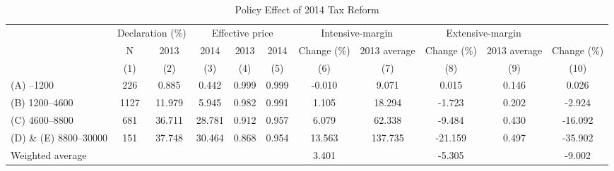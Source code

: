 \begin{table}

\caption{\label{tab:policy-effect}Policy Effect of 2014 Tax Reform}
\centering
\fontsize{7}{9}\selectfont
\begin{threeparttable}
\begin{tabular}[t]{>{\raggedright\arraybackslash}p{10em}cccccccccc}
\toprule
\multicolumn{2}{c}{ } & \multicolumn{2}{c}{Declaration (\%)} & \multicolumn{3}{c}{Effective price} & \multicolumn{2}{c}{Intensive-margin} & \multicolumn{2}{c}{Extensive-margin} \\
\cmidrule(l{3pt}r{3pt}){3-4} \cmidrule(l{3pt}r{3pt}){5-7} \cmidrule(l{3pt}r{3pt}){8-9} \cmidrule(l{3pt}r{3pt}){10-11}
\multicolumn{1}{c}{2013 Income bracket} & \multicolumn{1}{c}{N} & \multicolumn{1}{c}{2013} & \multicolumn{1}{c}{2014} & \multicolumn{1}{c}{2013} & \multicolumn{1}{c}{2014} & \multicolumn{1}{c}{Change (\%)} & \multicolumn{1}{c}{2013 average} & \multicolumn{1}{c}{Change (\%)} & \multicolumn{1}{c}{2013 average} & \multicolumn{1}{c}{Change (\%)} \\
\cmidrule(l{3pt}r{3pt}){1-1} \cmidrule(l{3pt}r{3pt}){2-2} \cmidrule(l{3pt}r{3pt}){3-3} \cmidrule(l{3pt}r{3pt}){4-4} \cmidrule(l{3pt}r{3pt}){5-5} \cmidrule(l{3pt}r{3pt}){6-6} \cmidrule(l{3pt}r{3pt}){7-7} \cmidrule(l{3pt}r{3pt}){8-8} \cmidrule(l{3pt}r{3pt}){9-9} \cmidrule(l{3pt}r{3pt}){10-10} \cmidrule(l{3pt}r{3pt}){11-11}
 & (1) & (2) & (3) & (4) & (5) & (6) & (7) & (8) & (9) & (10)\\
\midrule
(A) --1200 & 226 & 0.885 & 0.442 & 0.999 & 0.999 & -0.010 & 9.071 & 0.015 & 0.146 & 0.026\\
(B) 1200--4600 & 1127 & 11.979 & 5.945 & 0.982 & 0.991 & 1.105 & 18.294 & -1.723 & 0.202 & -2.924\\
(C) 4600--8800 & 681 & 36.711 & 28.781 & 0.912 & 0.957 & 6.079 & 62.338 & -9.484 & 0.430 & -16.092\\
(D) \& (E) 8800--30000 & 151 & 37.748 & 30.464 & 0.868 & 0.954 & 13.563 & 137.735 & -21.159 & 0.497 & -35.902\\
Weighted average &  &  &  &  &  & 3.401 &  & -5.305 &  & -9.002\\
\bottomrule
\end{tabular}
\begin{tablenotes}

\end{tablenotes}
\end{threeparttable}
\end{table}
